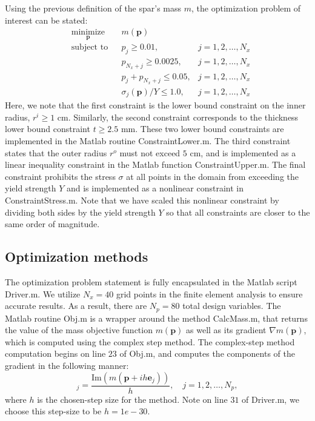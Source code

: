 \documentclass[11pt]{article}
\newcommand{\bs}[1] {\boldsymbol{#1}}
\begin{document}
Using the previous definition of the spar's mass $m$, the
optimization problem of interest can be stated:
\begin{equation}
\begin{aligned}
& \underset{\bs{p}}{\text{minimize}}
& & m(\bs{p}) \\
& \text{subject to}
& & p_j \geq 0.01,                    &j=1,2,\dots,N_x \\
&&& p_{N_x+j} \geq 0.0025,            &j=1,2,\dots,N_x\\
&&& p_j + p_{N_x +j} \leq 0.05,       &j=1,2,\dots,N_x \\
&&& \sigma_j(\bs{p})/Y \leq 1.0,      &j=1,2,\dots,N_x
\end{aligned}
\end{equation}
Here, we note that the first constraint is the lower bound
constraint on the inner radius, $r^i \geq 1$ cm. Similarly,
the second constraint corresponds to the thickness lower
bound constraint $t \geq 2.5$ mm. These two lower bound
constraints are implemented in the Matlab routine
ConstraintLower.m. The third constraint states that the
outer radius $r^o$ must not exceed $5$ cm, and is implemented
as a linear inequality constraint in the Matlab function
ConstraintUpper.m. The final constraint prohibits the
stress $\sigma$ at all points in the domain from exceeding
the yield strength $Y$ and is implemented as a nonlinear
constraint in ConstraintStress.m. Note that we have scaled
this nonlinear constraint by dividing both sides by the
yield strength $Y$ so that all constraints are closer
to the same order of magnitude.

\subsection{Optimization methods}

The optimization problem statement is fully encapsulated
in the Matlab script Driver.m. We utilize $N_x=40$ grid
points in the finite element analysis to ensure accurate
results. As a result, there are $N_p=80$ total design
variables. The Matlab routine Obj.m is a wrapper around
the method CalcMass.m, that returns the value of the
mass objective function $m(\bs{p})$ as well as its
gradient $\nabla m(\bs{p})$, which is computed using
the complex step method. The complex-step method
computation begins on line $23$ of Obj.m, and computes the
components of the gradient in the following manner:
\begin{equation}
[ \nabla m(\bs{p}) ]_j = \frac{\text{Im}(m( \bs{p} + i h \bs{e}_j))}{h},
\quad j=1,2,\dots,N_p,
\end{equation}
where $h$ is the chosen-step size for the method. Note
on line $31$ of Driver.m, we choose this step-size
to be $h=1e-30$. 
\end{document}
